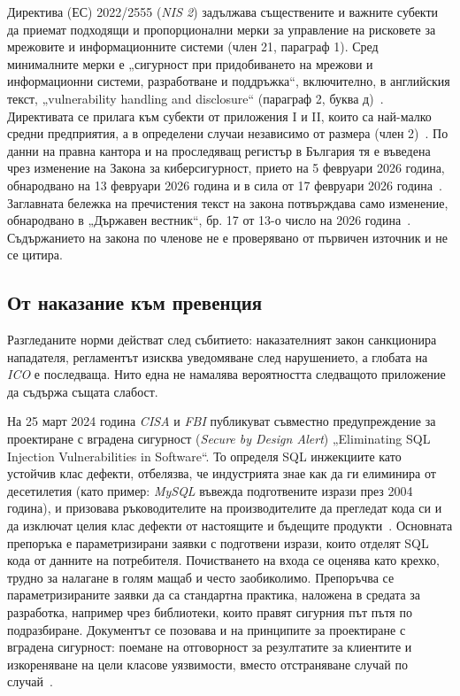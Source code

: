 Директива (ЕС) 2022/2555 (\textit{NIS 2}) задължава съществените и важните субекти да
приемат подходящи и пропорционални мерки за управление на рисковете за мрежовите и
информационните системи (член 21, параграф 1). Сред минималните мерки е „сигурност
при придобиването на мрежови и информационни системи, разработване и поддръжка“,
включително, в английския текст, „vulnerability handling and disclosure“ (параграф 2,
буква д)~\cite{nis2}. Директивата се прилага към субекти от приложения I и II, които са най-малко
средни предприятия, а в определени случаи независимо от размера (член 2)~\cite{nis2}.
По данни на правна кантора и на проследяващ регистър в България тя е въведена чрез
изменение на Закона за киберсигурност, прието на 5 февруари 2026 година,
обнародвано на 13 февруари 2026 година и в сила от 17 февруари 2026
година~\cite{cms_bg_nis2,risi_bg_nis2}. Заглавната бележка на пречистения текст на
закона потвърждава само изменение, обнародвано в „Държавен вестник“, бр. 17 от 13-о
число на 2026 година~\cite{bg_zks}. Съдържанието на закона по членове не е
проверявано от първичен източник и не се цитира.

\subsection{От наказание към превенция}
\label{sec:cybercrime-prevention}

Разгледаните норми действат след събитието: наказателният закон санкционира
нападателя, регламентът изисква уведомяване след нарушението, а глобата на \textit{ICO}
е последваща. Нито една не намалява вероятността следващото приложение да съдържа
същата слабост.

На 25 март 2024 година \textit{CISA} и \textit{FBI} публикуват съвместно
предупреждение за проектиране с вградена сигурност (\textit{Secure by Design Alert})
„Eliminating SQL Injection Vulnerabilities in Software“. То определя SQL инжекциите
като устойчив клас дефекти, отбелязва, че индустрията знае как да ги елиминира от
десетилетия (като пример: \textit{MySQL} въвежда подготвените изрази през 2004
година), и призовава ръководителите на производителите да прегледат кода си и да
изключат целия клас дефекти от настоящите и бъдещите продукти~\cite{cisa_sqli_alert}.
Основната препоръка е параметризирани заявки с подготвени изрази, които отделят
SQL кода от данните на потребителя. Почистването на входа се оценява като крехко,
трудно за налагане в голям мащаб и често заобиколимо. Препоръчва се
параметризираните заявки да са стандартна практика, наложена в средата за
разработка, например чрез библиотеки, които правят сигурния път пътя по
подразбиране. Документът се позовава и на принципите за проектиране с вградена
сигурност: поемане на отговорност за резултатите за клиентите и изкореняване на
цели класове уязвимости, вместо отстраняване случай по случай~\cite{cisa_sqli_alert}.

